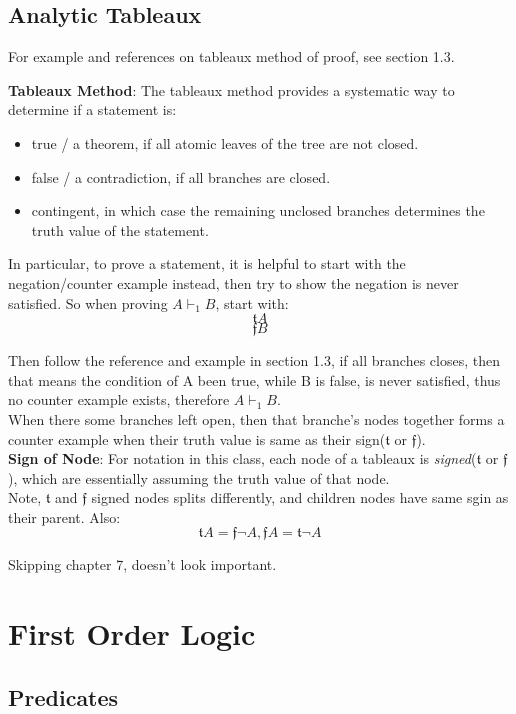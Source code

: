 \documentclass{article}
\newcommand{\true}{{\mathfrak{t}}}
\newcommand{\false}{{\mathfrak{f}}}
\begin{document}
\subsection{Analytic Tableaux}
For example and references on tableaux method of proof, see section 1.3.\\

\noindent
{\large

\textbf{Tableaux Method}: The tableaux method provides a systematic way to determine if a statement is:
\begin{itemize}
    \item true / a theorem, if all atomic leaves of the tree are not closed.
    \item false / a contradiction, if all branches are closed.
    \item contingent, in which case the remaining unclosed branches determines the truth value of the statement.
\end{itemize}
In particular, to prove a statement, it is helpful to start with the negation/counter example instead, then try to show 
the negation is never satisfied. So when proving $A \vdash_1 B$, start with:
$$
\true A
$$
$$
\false B
$$

Then follow the reference and example in section 1.3, if all branches closes, then that means the 
condition of A been true, while B is false, is never satisfied, thus no counter example exists, therefore
$A \vdash_1 B$.\\

When there some branches left open, then that branche's nodes together forms a counter example when their truth
value is same as their sign($\true$ or $\false$). \\

\textbf{Sign of Node}: For notation in this class, each node of a tableaux is \emph{signed}($\true$ or $\false$),
which are essentially assuming the truth value of that node. \\Note, $\true$ and $\false$ signed 
nodes splits differently, and children nodes have same sgin as their parent. Also:
$$
\true A = \false \lnot A, \false A = \true \lnot A
$$
}

Skipping chapter 7, doesn't look important.
\newpage


\section{First Order Logic}
\subsection{Predicates}
\end{document}
